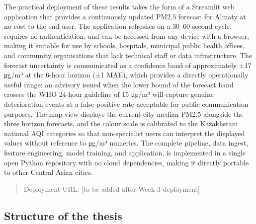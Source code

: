 The practical deployment of these results takes the form of a Streamlit web application that provides a continuously updated PM2.5 forecast for Almaty at no cost to the end user. The application refreshes on a 30--60 second cycle, requires no authentication, and can be accessed from any device with a browser, making it suitable for use by schools, hospitals, municipal public health offices, and community organisations that lack technical staff or data infrastructure. The forecast uncertainty is communicated as a confidence band of approximately ±17 μg/m³ at the 6-hour horizon (±1 MAE), which provides a directly operationally useful range: an advisory issued when the lower bound of the forecast band crosses the WHO 24-hour guideline of 15 μg/m³ will capture genuine deterioration events at a false-positive rate acceptable for public communication purposes. The map view displays the current city-median PM2.5 alongside the three horizon forecasts, and the colour scale is calibrated to the Kazakhstani national AQI categories so that non-specialist users can interpret the displayed values without reference to μg/m³ numerics. The complete pipeline, data ingest, feature engineering, model training, and application, is implemented in a single open Python repository with no cloud dependencies, making it directly portable to other Central Asian cities.

\begin{quote}
Deployment URL: {[}to be added after Week 3 deployment{]}
\end{quote}

\subsection{Structure of the thesis}\label{structure-of-the-thesis}

